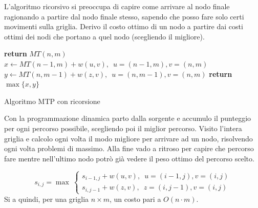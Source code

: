 \documentclass[a4paper,12pt, oneside]{book}
\begin{document}
L'algoritmo ricorsivo si preoccupa di capire come arrivare al nodo finale
ragionando a partire dal nodo finale stesso, sapendo che posso fare solo certi
movimenti sulla griglia. Derivo il costo ottimo di un nodo a partire dai costi
ottimi dei nodi che portano a quel nodo (scegliendo il migliore).
\begin{algorithm}
  \begin{algorithmic}
    \State \textbf{return} $MT(n,m)$
    \EndIf
    \State $x\gets MT(n-1,m) + w(u,v),\,\,\, u=(n-1,m),v=(n,m)$
    \State $y\gets MT(n,m-1) + w(z,v),\,\,\, u=(n,m-1),v=(n,m)$
    \State \textbf{return} $\max\{x,y\}$
  \end{algorithmic}
  \caption{Algoritmo MTP con ricorsione}
\end{algorithm}
Con la programmazione dinamica parto dalla sorgente e accumulo il punteggio per
ogni percorso possibile, scegliendo poi il miglior percorso. Visito l'intera
griglia e calcolo ogni volta il modo migliore per arrivare ad un nodo,
risolvendo ogni volta problemi di massimo. Alla fine vado a ritroso per capire
che percorso fare mentre nell'ultimo nodo potrò già vedere il peso ottimo del
percorso scelto.

\[s_{i,j}=\max\
  \begin{cases}
    s_{i-1,j} + w(u,v),\,\,\, u=(i-1,j),v=(i,j)\\
    s_{i,j-1} + w(z,v),\,\,\, z=(i,j-1),v=(i,j)
  \end{cases}
\]
Si a quindi, per una griglia $n\times m$, un costo pari a $O(n\cdot m)$.
\end{document}
